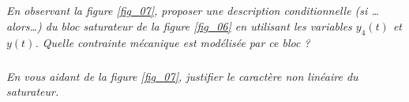 \documentclass[10pt]{article}
\begin{document}
\subparagraph{}
\textit{En observant la figure \ref{fig_07}, proposer une description conditionnelle (si  …alors…) du bloc saturateur de la figure \ref{fig_06} en utilisant les variables $y_4(t)$ et $y(t)$. Quelle contrainte mécanique est modélisée par ce bloc ?}


\subparagraph{}
\textit{En vous aidant de la figure \ref{fig_07}, justifier le caractère non linéaire du saturateur.}
\end{document}
